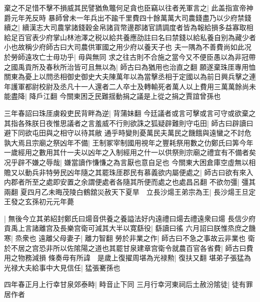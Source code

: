棄之不足惜不擊不損威其民譬猶魚鼈何足貪也臣竊以往者羌軍言之|{
	此盖指宣帝神爵元年羌反時}
暴師曾未一年兵出不踰千里費四十餘萬萬大司農錢盡乃以少府禁錢續之|{
	續漢志大司農掌諸錢穀金帛諸貨幣邊郡諸官請調度者皆為報給損多益寡取相給足百官表少府掌山林池澤之税以給共養應劭註曰名曰禁錢以給私養自别為藏少者小也故稱少府師古曰大司農供軍國之用少府以養天子也}
夫一隅為不善費尚如此况於勞師遠攻亡士毋功乎|{
	毋與無同}
求之往古則不合施之當今又不便臣愚以為非冠帶之國禹貢所及春秋所治皆可且無以為|{
	師古曰為猶用也治直之翻}
願遂棄珠厓專用恤關東為憂上以問丞相御史御史大夫陳萬年以為當擊丞相于定國以為前日興兵擊之連年護軍都尉校尉及丞凡十一人還者二人卒士及轉輸死者萬人以上費用三萬萬餘尚未能盡降|{
	降戶江翻}
今關東困乏民難揺動捐之議是上從之捐之賈誼曾孫也

三年春詔曰珠厓虜殺吏民背畔為逆|{
	背蒲妹翻}
今廷議者或言可擊或言可守或欲棄之其指各殊朕日夜惟思議者之言羞威不行則欲誅之狐疑辟難則守屯田|{
	師古曰辟讀曰避下同欲屯田與之相守以待其敝}
通乎時變則憂萬民夫萬民之饑餓與遠蠻之不討危孰大焉且宗廟之祭凶年不備|{
	王制冢宰制國用視年之豐耗祭用數之仂鄭氏曰筭今年一歲經用之數用其什一夫以凶年之入制經用之什一以供祭則宗廟之禮宜有不備者矣}
况乎辟不嫌之辱哉|{
	嫌當讀作慊慊之為言厭也意自足也}
今關東大困倉庫空虛無以相贍又以動兵非特勞民凶年隨之其罷珠厓郡民有慕義欲内屬便處之|{
	師古曰欲有來入内郡者所至之處即安置之余謂便處者各隨其所便而處之也處昌呂翻}
不欲勿彊|{
	彊其兩翻}
夏四月乙未晦茂陵白鶴舘災赦天下夏旱　立長沙煬王弟宗為王|{
	長沙煬王旦定王發之玄孫初元元年薨}


|{
	無後今立其弟紹封鄭氏曰煬音供養之養謚法好内遠禮曰煬去禮遠衆曰煬}
長信少府貢禹上言諸離宫及長樂宫衛可減其大半以寛繇役|{
	繇讀曰徭}
六月詔曰朕惟烝庶之饑寒|{
	烝衆也}
遠離父母妻子|{
	離力智翻}
勞於非業之作|{
	師古曰不急之事故云非業也}
衛於不居之宫恐非所以佐隂陽之道也其罷甘泉建章宫衛令就農百官各省費|{
	師古曰費用之物務減損}
條奏毋有所諱　是歲上復擢周堪為光禄勲|{
	復扶又翻}
堪弟子張猛為光禄大夫給事中大見信任|{
	猛張騫孫也}


四年春正月上行幸甘泉郊泰畤|{
	畤音止下同}
三月行幸河東祠后土赦汾隂徒|{
	徒有罪居作者}


